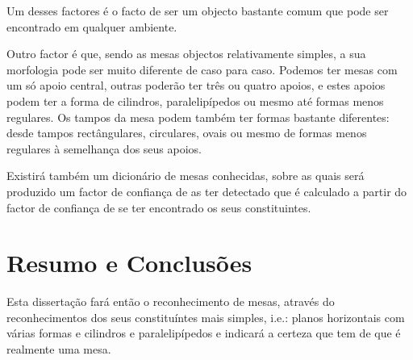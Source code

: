 Um desses factores é o facto de ser um objecto bastante comum que pode ser encontrado em qualquer ambiente.

Outro factor é que, sendo as mesas objectos relativamente simples, a sua morfologia pode ser muito diferente de caso para caso.
Podemos ter mesas com um só apoio central, outras poderão ter três ou quatro apoios, e estes apoios podem
ter a forma de cilindros, paralelipípedos ou mesmo até formas menos regulares. Os tampos da mesa podem
também ter formas bastante diferentes: desde tampos rectângulares, circulares, ovais ou mesmo de formas 
menos regulares à semelhança dos seus apoios.

Existirá também um dicionário de mesas conhecidas, sobre as quais será produzido um factor de confiança de
as ter detectado que é calculado a partir do factor de confiança de se ter encontrado os seus constituintes.



\section{Resumo e Conclusões}

Esta dissertação fará então o reconhecimento de mesas, através do reconhecimentos dos seus constituíntes mais
simples, i.e.: planos horizontais com várias formas e cilindros e paralelipípedos e indicará a certeza que tem
de que é realmente uma mesa.